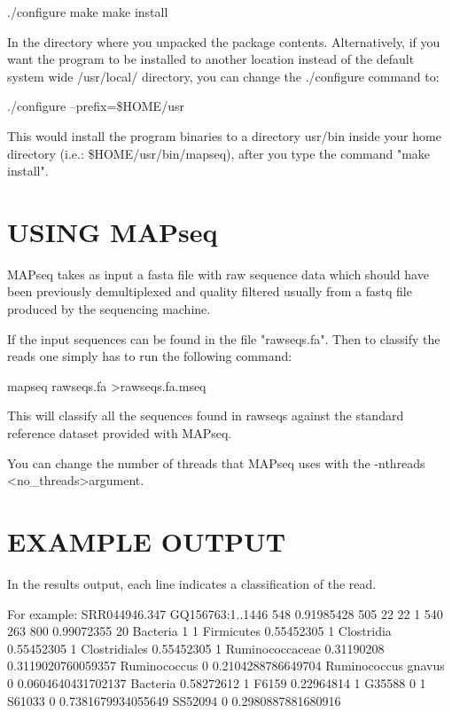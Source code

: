 \documentclass[10pt,a4paper]{article}
\begin{document}
./configure
make
make install

In the directory where you unpacked the package contents.
Alternatively, if you want the program to be installed to another
location instead of the default system wide /usr/local/ directory,
you can change the ./configure command to:

./configure --prefix=\$HOME/usr

This would install the program binaries to a directory usr/bin inside
your home directory (i.e.: \$HOME/usr/bin/mapseq), after you type
the command "make install".



\section{USING MAPseq}

MAPseq takes as input a fasta file with raw sequence data which should have been previously
demultiplexed and quality filtered usually from a fastq file produced by the sequencing machine.

If the input sequences can be found in the file "rawseqs.fa". Then to classify the reads
one simply has to run the following command:

mapseq rawseqs.fa \textgreater rawseqs.fa.mseq

This will classify all the sequences found in rawseqs against the standard reference dataset
provided with MAPseq.

You can change the number of threads that MAPseq uses with the -nthreads {\textless}no\_threads\textgreater argument.


\section{EXAMPLE OUTPUT}

In the results output, each line indicates a classification of the read.

For example:
SRR044946.347   GQ156763:1..1446        548     0.91985428      505     22      22      1       540     263     800     0.99072355      20              Bacteria        1       1       Firmicutes      0.55452305      1       Clostridia      0.55452305      1       Clostridiales   0.55452305      1       Ruminococcaceae 0.31190208      0.3119020760059357      Ruminococcus    0       0.2104288786649704      Ruminococcus gnavus     0       0.0604640431702137              Bacteria        0.58272612      1       F6159   0.22964814      1       G35588  0       1       S61033  0       0.7381679934055649      SS52094 0       0.2980887881680916
\end{document}
